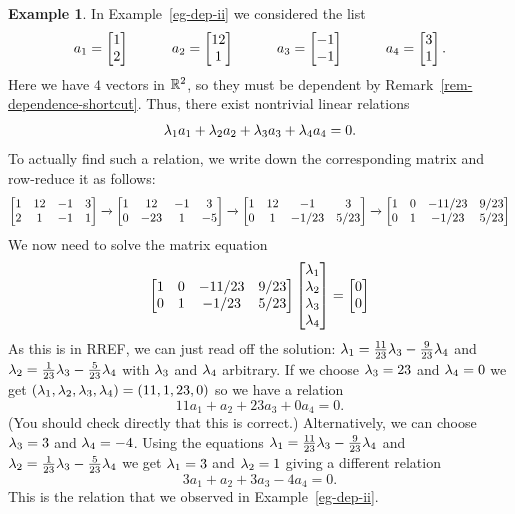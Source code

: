 \documentclass[reqno]{amsart}
\theoremstyle{definition}
\newtheorem{example}[theorem]{Example}
\begin{document}
\begin{example}\label{eg-dep-ii-matrix}
 In Example~\ref{eg-dep-ii} we considered the list
 \[ a_1 = \left[\begin{matrix}  1 \\  2 \end{matrix}\right] \hspace{3em}
    a_2 = \left[\begin{matrix} 12 \\  1 \end{matrix}\right] \hspace{3em}
    a_3 = \left[\begin{matrix} -1 \\ -1 \end{matrix}\right] \hspace{3em}
    a_4 = \left[\begin{matrix}  3 \\  1 \end{matrix}\right].
 \]
 Here we have $4$ vectors in ${\mathbb{R}}^2$, so they must be dependent by
 Remark~\ref{rem-dependence-shortcut}.  Thus, there exist nontrivial
 linear relations
 \[ \lambda_1a_1 + \lambda_2a_2 + \lambda_3a_3 + \lambda_4a_4 = 0. \]
 To actually find such a relation, we write down the corresponding
 matrix and row-reduce it as follows:
 \[
  \left[\begin{matrix}
   1 & 12 & -1 & 3 \\
   2 & 1  & -1 & 1
  \end{matrix}\right]
  \xrightarrow{}
  \left[\begin{matrix}
   1 &  12 & -1 & 3 \\
   0 & -23 &  1 & -5
  \end{matrix}\right]
  \xrightarrow{}
  \left[\begin{matrix}
   1 &  12 & -1 & 3 \\
   0 &  1 & -1/23 & 5/23
  \end{matrix}\right]
  \xrightarrow{}
  \left[\begin{matrix}
   1 &  0 & -11/23 & 9/23 \\
   0 &  1 & -1/23 & 5/23
  \end{matrix}\right]
 \]
 We now need to solve the matrix equation
 \[ \left[\begin{matrix}
     1 &  0 & -11/23 & 9/23 \\
     0 &  1 & -1/23 & 5/23
    \end{matrix}\right]
    \left[\begin{matrix} \lambda_1 \\ \lambda_2 \\ \lambda_3 \\ \lambda_4 \end{matrix}\right] =
    \left[\begin{matrix} 0 \\ 0 \end{matrix}\right]
 \]
 As this is in RREF, we can just read off the solution:
 $\lambda_1=\frac{11}{23}\lambda_3-\frac{9}{23}\lambda_4$ and
 $\lambda_2=\frac{1}{23}\lambda_3-\frac{5}{23}\lambda_4$
 with $\lambda_3$ and $\lambda_4$ arbitrary.  If we choose $\lambda_3=23$ and
 $\lambda_4=0$ we get $(\lambda_1,\lambda_2,\lambda_3,\lambda_4)=(11,1,23,0)$ so we have a
 relation
 \[ 11 a_1 + a_2 + 23 a_3 + 0 a_4 = 0. \]
 (You should check directly that this is correct.)  Alternatively, we
 can choose $\lambda_3=3$ and $\lambda_4=-4$.  Using the equations
 $\lambda_1=\frac{11}{23}\lambda_3-\frac{9}{23}\lambda_4$ and
 $\lambda_2=\frac{1}{23}\lambda_3-\frac{5}{23}\lambda_4$ we get $\lambda_1=3$ and
 $\lambda_2=1$ giving a different relation
 \[ 3a_1 + a_2 + 3a_3 - 4a_4 = 0. \]
 This is the relation that we observed in Example~\ref{eg-dep-ii}.
\end{example}
\end{document}
